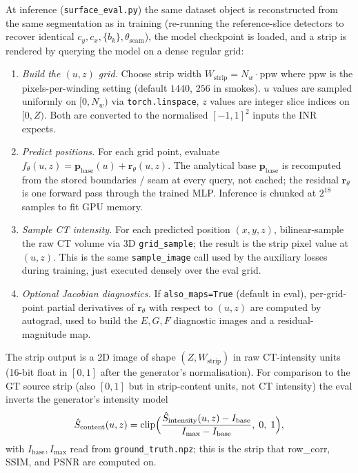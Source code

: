 \documentclass[11pt,a4paper]{article}
\begin{document}
At inference (\texttt{surface\_eval.py}) the same dataset object is reconstructed from the same segmentation as in training (re-running the reference-slice detectors to recover identical $c_y, c_x, \{b_k\}, \theta_{\text{seam}}$), the model checkpoint is loaded, and a strip is rendered by querying the model on a dense regular grid:

\begin{enumerate}
    \item \emph{Build the $(u, z)$ grid.} Choose strip width $W_{\text{strip}} = N_w \cdot \mathrm{ppw}$ where $\mathrm{ppw}$ is the pixels-per-winding setting (default $1440$, $256$ in smokes). $u$ values are sampled uniformly on $[0, N_w)$ via \texttt{torch.linspace}, $z$ values are integer slice indices on $[0, Z)$. Both are converted to the normalised $[-1, 1]^2$ inputs the INR expects.
    \item \emph{Predict positions.} For each grid point, evaluate $f_\theta(u, z) = \bm{p}_{\text{base}}(u) + \bm{r}_\theta(u, z)$. The analytical base $\bm{p}_{\text{base}}$ is recomputed from the stored boundaries / seam at every query, not cached; the residual $\bm{r}_\theta$ is one forward pass through the trained MLP. Inference is chunked at $2^{18}$ samples to fit GPU memory.
    \item \emph{Sample CT intensity.} For each predicted position $(x, y, z)$, bilinear-sample the raw CT volume via 3D \texttt{grid\_sample}; the result is the strip pixel value at $(u, z)$. This is the same \texttt{sample\_image} call used by the auxiliary losses during training, just executed densely over the eval grid.
    \item \emph{Optional Jacobian diagnostics.} If \texttt{also\_maps=True} (default in eval), per-grid-point partial derivatives of $\bm{r}_\theta$ with respect to $(u, z)$ are computed by autograd, used to build the $E, G, F$ diagnostic images and a residual-magnitude map.
\end{enumerate}

The strip output is a 2D image of shape $(Z, W_{\text{strip}})$ in raw CT-intensity units (16-bit float in $[0, 1]$ after the generator's normalisation). For comparison to the GT source strip (also $[0, 1]$ but in strip-content units, not CT intensity) the eval inverts the generator's intensity model
\begin{equation}
    \hat{S}_{\text{content}}(u, z) = \mathrm{clip}\Bigl(\frac{\hat{S}_{\text{intensity}}(u, z) - I_{\text{base}}}{I_{\max} - I_{\text{base}}},\; 0,\; 1\Bigr),
    \label{eq:intensity_inversion}
\end{equation}
with $I_{\text{base}}, I_{\max}$ read from \texttt{ground\_truth.npz}; this is the strip that row\_corr, SSIM, and PSNR are computed on.
\end{document}
